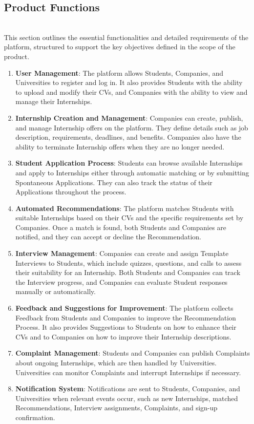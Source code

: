 \subsection{Product Functions}\\
This section outlines the essential functionalities and detailed requirements of the platform, structured to support the key objectives defined in the scope of the product.
\begin{enumerate}
    \item \textbf{User Management}: The platform allows Students, Companies, and Universities to register and log in. It also provides Students with the ability to upload and modify their CVs, and Companies with the ability to view and manage their Internships.
    \item \textbf{Internship Creation and Management}: Companies can create, publish, and manage Internship offers on the platform. They define details such as job description, requirements, deadlines, and benefits. Companies also have the ability to terminate Internship offers when they are no longer needed.
    \item \textbf{Student Application Process}: Students can browse available Internships and apply to Internships either through automatic matching or by submitting Spontaneous Applications. They can also track the status of their Applications throughout the process.
    \item \textbf{Automated Recommendations}: The platform matches Students with suitable Internships based on their CVs and the specific requirements set by Companies. Once a match is found, both Students and Companies are notified, and they can accept or decline the Recommendation.
    \item \textbf{Interview Management}: Companies can create and assign Template Interviews to Students, which include quizzes, questions, and calls to assess their suitability for an Internship. Both Students and Companies can track the Interview progress, and Companies can evaluate Student responses manually or automatically.
    \item \textbf{Feedback and Suggestions for Improvement}: The platform collects Feedback from Students and Companies to improve the Recommendation Process. It also provides Suggestions to Students on how to enhance their CVs and to Companies on how to improve their Internship descriptions.
    \item \textbf{Complaint Management}: Students and Companies can publish Complaints about ongoing Internships, which are then handled by Universities. Universities can monitor Complaints and interrupt Internships if necessary.
    \item \textbf{Notification System}: Notifications are sent to Students, Companies, and Universities when relevant events occur, such as new Internships, matched Recommendations, Interview assignments, Complaints, and sign-up confirmation.
\end{enumerate}

